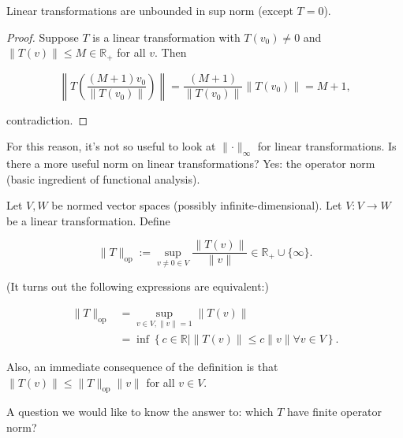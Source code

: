 \begin{theorem}

Linear transformations are unbounded in sup norm (except \(T = 0\)).

\end{theorem}

\begin{proof}

Suppose \(T\) is a linear transformation with \(T(v_0) \neq 0\) and \(\lVert T(v) \rVert \leq M \in \mathbb{R}_{+}\) for all \(v\). Then

\[
\left\lVert T\left(  \frac{(M+1) v_0}{\lVert T(v_0) \rVert} \right) \right\rVert =   \frac{(M+1) }{\lVert T(v_0) \rVert} \left\lVert T\left(  v_0\right) \right\rVert = M+1,
\]

contradiction.

\end{proof}

For this reason, it's not so useful to look at \(\lVert \cdot \rVert_\infty\) for linear transformations. Is there a more useful norm on linear transformations? Yes: the operator norm (basic ingredient of functional analysis).

\begin{definition}

Let \(V, W\) be normed vector spaces (possibly infinite-dimensional). Let \(V: V \to W\) be a linear transformation. Define

\[
\lVert T \rVert_{\text{op}} := \sup_{v \neq 0 \in V} \frac{\lVert T(v) \rVert}{\lVert v \rVert} \in \mathbb{R}_{+} \cup \{\infty\}.
\]

(It turns out the following expressions are equivalent:)

\begin{align*}
\lVert T \rVert_{\text{op}} & = \sup_{v \in V, \lVert v \rVert = 1} \lVert T(v) \rVert
\\ & = \inf \left\{c \in \mathbb{R} | \lVert T(v) \rVert \leq c \lVert v \rVert \forall v \in V \right\}.
\end{align*}

Also, an immediate consequence of the definition is that \(\lVert T(v) \rVert \leq \lVert T \rVert_{\text{op}} \lVert v \rVert\) for all \(v \in V\).

\end{definition}

A question we would like to know the answer to: which \(T\) have finite operator norm?


